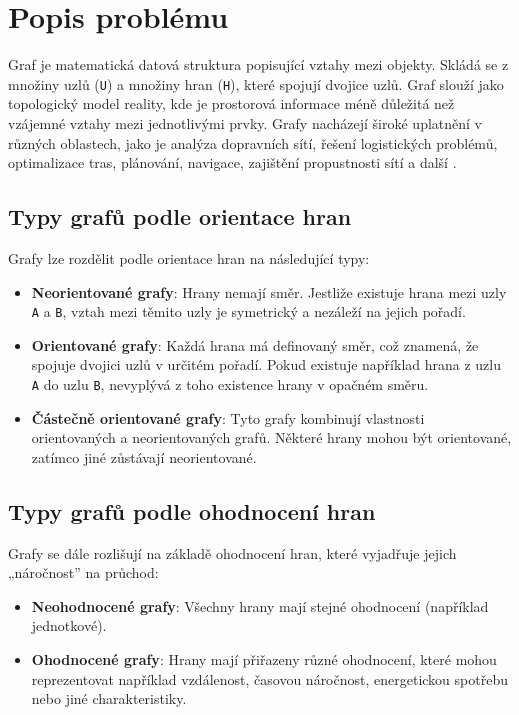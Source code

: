 \section{Popis problému}

Graf je matematická datová struktura popisující vztahy mezi objekty. Skládá se z množiny uzlů (\texttt{U}) a množiny hran (\texttt{H}), které spojují dvojice uzlů. Graf slouží jako topologický model reality, kde je prostorová informace méně důležitá než vzájemné vztahy mezi jednotlivými prvky. Grafy nacházejí široké uplatnění v různých oblastech, jako je analýza dopravních sítí, řešení logistických problémů, optimalizace tras, plánování, navigace, zajištění propustnosti sítí a další \cite{geoinf8}\cite{geoinf9}.

\subsection{Typy grafů podle orientace hran}
Grafy lze rozdělit podle orientace hran na následující typy:
\begin{itemize}
    \item \textbf{Neorientované grafy}: Hrany nemají směr. Jestliže existuje hrana mezi uzly \texttt{A} a \texttt{B}, vztah mezi těmito uzly je symetrický a nezáleží na jejich pořadí\cite{geoinf8}.
    
    \item \textbf{Orientované grafy}: Každá hrana má definovaný směr, což znamená, že spojuje dvojici uzlů v určitém pořadí. Pokud existuje například hrana z uzlu \texttt{A} do uzlu \texttt{B}, nevyplývá z toho existence hrany v opačném směru\cite{geoinf8}.
    
    \item \textbf{Částečně orientované grafy}: Tyto grafy kombinují vlastnosti orientovaných a neorientovaných grafů. Některé hrany mohou být orientované, zatímco jiné zůstávají neorientované\cite{geoinf8}.
\end{itemize}

\subsection{Typy grafů podle ohodnocení hran}
Grafy se dále rozlišují na základě ohodnocení hran, které vyjadřuje jejich „náročnost” na průchod:
\begin{itemize}
    \item \textbf{Neohodnocené grafy}: Všechny hrany mají stejné ohodnocení (například jednotkové).
    
    \item \textbf{Ohodnocené grafy}: Hrany mají přiřazeny různé ohodnocení, které mohou reprezentovat například vzdálenost, časovou náročnost, energetickou spotřebu nebo jiné charakteristiky.
\end{itemize}

